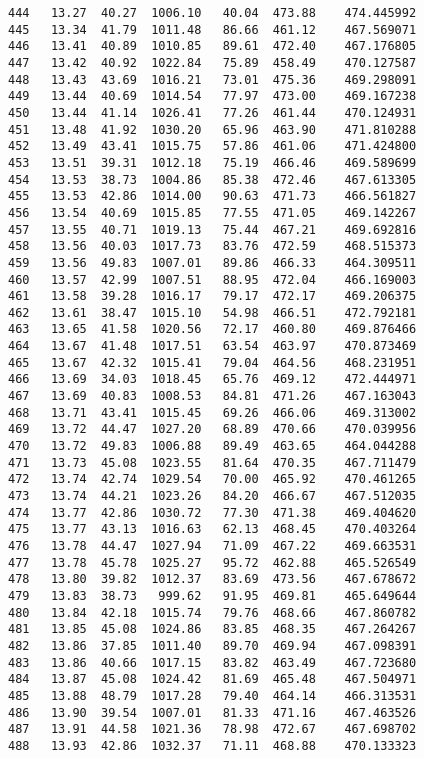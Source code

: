 \documentclass[11pt]{article}
\begin{document}
\begin{tcolorbox}[breakable, size=fbox, boxrule=.5pt, pad at break*=1mm, opacityfill=0]
\begin{Verbatim}[commandchars=\\\{\}]
444   13.27  40.27  1006.10   40.04  473.88    474.445992
445   13.34  41.79  1011.48   86.66  461.12    467.569071
446   13.41  40.89  1010.85   89.61  472.40    467.176805
447   13.42  40.92  1022.84   75.89  458.49    470.127587
448   13.43  43.69  1016.21   73.01  475.36    469.298091
449   13.44  40.69  1014.54   77.97  473.00    469.167238
450   13.44  41.14  1026.41   77.26  461.44    470.124931
451   13.48  41.92  1030.20   65.96  463.90    471.810288
452   13.49  43.41  1015.75   57.86  461.06    471.424800
453   13.51  39.31  1012.18   75.19  466.46    469.589699
454   13.53  38.73  1004.86   85.38  472.46    467.613305
455   13.53  42.86  1014.00   90.63  471.73    466.561827
456   13.54  40.69  1015.85   77.55  471.05    469.142267
457   13.55  40.71  1019.13   75.44  467.21    469.692816
458   13.56  40.03  1017.73   83.76  472.59    468.515373
459   13.56  49.83  1007.01   89.86  466.33    464.309511
460   13.57  42.99  1007.51   88.95  472.04    466.169003
461   13.58  39.28  1016.17   79.17  472.17    469.206375
462   13.61  38.47  1015.10   54.98  466.51    472.792181
463   13.65  41.58  1020.56   72.17  460.80    469.876466
464   13.67  41.48  1017.51   63.54  463.97    470.873469
465   13.67  42.32  1015.41   79.04  464.56    468.231951
466   13.69  34.03  1018.45   65.76  469.12    472.444971
467   13.69  40.83  1008.53   84.81  471.26    467.163043
468   13.71  43.41  1015.45   69.26  466.06    469.313002
469   13.72  44.47  1027.20   68.89  470.66    470.039956
470   13.72  49.83  1006.88   89.49  463.65    464.044288
471   13.73  45.08  1023.55   81.64  470.35    467.711479
472   13.74  42.74  1029.54   70.00  465.92    470.461265
473   13.74  44.21  1023.26   84.20  466.67    467.512035
474   13.77  42.86  1030.72   77.30  471.38    469.404620
475   13.77  43.13  1016.63   62.13  468.45    470.403264
476   13.78  44.47  1027.94   71.09  467.22    469.663531
477   13.78  45.78  1025.27   95.72  462.88    465.526549
478   13.80  39.82  1012.37   83.69  473.56    467.678672
479   13.83  38.73   999.62   91.95  469.81    465.649644
480   13.84  42.18  1015.74   79.76  468.66    467.860782
481   13.85  45.08  1024.86   83.85  468.35    467.264267
482   13.86  37.85  1011.40   89.70  469.94    467.098391
483   13.86  40.66  1017.15   83.82  463.49    467.723680
484   13.87  45.08  1024.42   81.69  465.48    467.504971
485   13.88  48.79  1017.28   79.40  464.14    466.313531
486   13.90  39.54  1007.01   81.33  471.16    467.463526
487   13.91  44.58  1021.36   78.98  472.67    467.698702
488   13.93  42.86  1032.37   71.11  468.88    470.133323

\end{Verbatim}
\end{tcolorbox}
\end{document}
